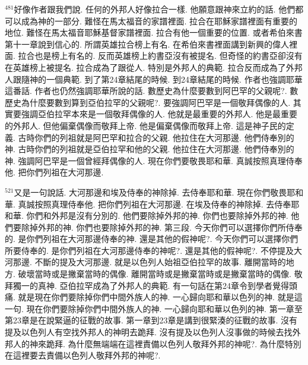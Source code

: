 \documentclass{book}
\begin{document}
$^{481}$好像作者跟我們說.
任何的外邦人好像拉合一樣.
他願意跟神來立約的話.
他們都可以成為神的一部分.
難怪在馬太福音的家譜裡面.
拉合在耶穌家譜裡面有重要的地位.
難怪在馬太福音耶穌基督家譜裡面.
拉合有他一個重要的位置.
或者希伯來書第十一章說到信心的.
所謂英雄拉合榜上有名.
在希伯來書裡面講到新興的偉人裡面.
拉合也是榜上有名的.
反而英雄榜上約書亞沒有被提名.
但奇怪的約書亞卻沒有在英雄榜上被提名.
拉合成為了跟從人.
特別是外邦人的典範.
拉合反而成為了外邦人跟隨神的一個典範.
到了第24章結尾的時候.
到24章結尾的時候.
作者也強調耶華這番話.
作者也仍然強調耶華所說的話.
數歷史為什麼要數到阿巴罕的父親呢?.
數歷史為什麼要數到算到亞伯拉罕的父親呢?.
要強調阿巴罕是一個敬拜偶像的人.
其實要強調亞伯拉罕本來是一個敬拜偶像的人.
他就是最重要的外邦人.
他是最重要的外邦人.
但他偏棄偶像而敬拜上帝.
他是偏棄偶像而敬拜上帝.
這是神子民的定義.
古時你們的列祖就是阿巴罕和拉合的父親.
他拉住在大河那邊.
他們侍奉別的神.
古時你們的列祖就是亞伯拉罕和他的父親.
他拉住在大河那邊.
他們侍奉別的神.
強調阿巴罕是一個曾經拜偶像的人.
現在你們要敬畏耶和華.
真誠按照真理侍奉他.
把你們列祖在大河那邊.

$^{521}$又是一句說話.
大河那邊和埃及侍奉的神除掉.
去侍奉耶和華.
現在你們敬畏耶和華.
真誠按照真理侍奉他.
把你們列祖在大河那邊.
在埃及侍奉的神除掉.
去侍奉耶和華.
你們和外邦是沒有分別的.
他們要除掉外邦的神.
你們也要除掉外邦的神.
他們要除掉外邦的神.
你們也要除掉外邦的神.
第三段.
今天你們可以選擇你們所侍奉的.
是你們列祖在大河那邊侍奉的神.
還是其他的假神呢?.
今天你們可以選擇你們所要侍奉的.
是你們列祖在大河那邊侍奉的神呢?.
還是其他的假神呢?.
不停提及大河那邊.
不斷的提及大河那邊.
就是以色列人始祖亞伯拉罕的故事.
離開當時的地方.
破壞當時或是撇棄當時的偶像.
離開當時或是撇棄當時或是撇棄當時的偶像.
敬拜獨一的真神.
亞伯拉罕成為了外邦人的典範.
有一句話在第24章令到學者覺得頭痛.
就是現在你們要除掉你們中間外族人的神.
一心歸向耶和華以色列的神.
就是這一句.
現在你們要除掉你們中間外族人的神.
一心歸向耶和華以色列的神.
第一章至第23章是在說緊逼的征戰的故事.
第一章到23章是講到很緊湊的征戰的故事.
沒有提及以色列人有空找外邦人的神明去跪拜.
沒有提及以色列人沒事做的時候去找外邦人的神來跪拜.
為什麼無端端在這裡責備以色列人敬拜外邦的神呢?.
為什麼特別在這裡要去責備以色列人敬拜外邦的神呢?.
\end{document}

